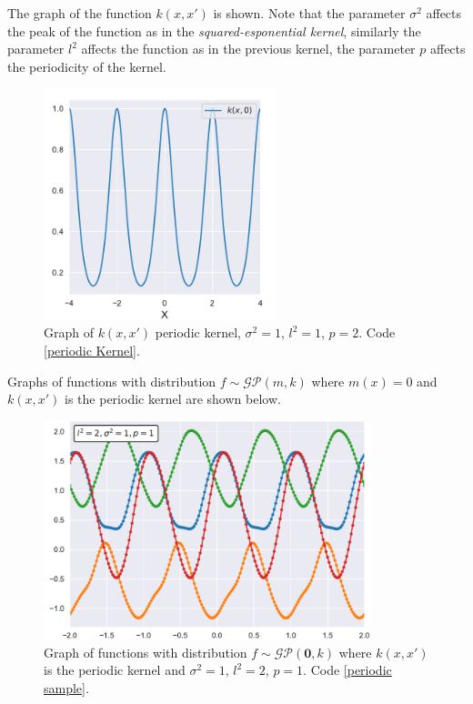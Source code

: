 The graph of the function $k(x,x')$ is shown. Note that the parameter $\sigma^2$ affects the peak of the function as in the \textit{squared-esponential kernel}, similarly the parameter $l^2$ affects the function as in the previous kernel, the parameter $p$ affects the periodicity of the kernel. 


\begin{figure}[h]
    \centering
    \includegraphics[width=0.6\textwidth]{images/Gaussian process/Periodic kernel.pdf}
    \caption{Graph of $k(x,x')$ periodic kernel, $\sigma^2=1$, $l^2=1$, $p=2$. Code \ref{periodic Kernel}.}
    \label{periodic kernel}
\end{figure}




\newpage
Graphs of functions with distribution $f\sim \mathcal{GP}(m,k)$ where $m(x)=0$ and $k(x,x')$ is the periodic kernel are shown below.

\begin{figure}[h]
    \centering
    \includegraphics[width=0.85\textwidth]{images/Gaussian process/Periodic sample.pdf}
    \caption{Graph of functions with distribution  $f\sim \mathcal{GP}(\bm{0},k)$ where $k(x,x')$ is the periodic kernel and $\sigma^2=1$, $l^2=2$, $p=1$. Code \ref{periodic sample}.}
    \label{3 sample periodic kerne zero mean}
\end{figure}

